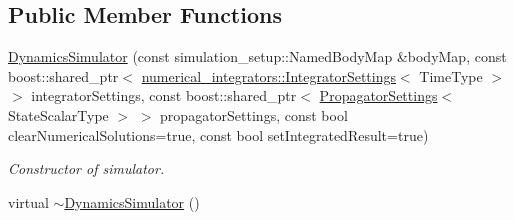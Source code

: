 \subsection*{Public Member Functions}
\begin{DoxyCompactItemize}
\item 
\hyperlink{classtudat_1_1propagators_1_1DynamicsSimulator_a95efdba717f763e8957182090d92dff7}{Dynamics\+Simulator} (const simulation\+\_\+setup\+::\+Named\+Body\+Map \&body\+Map, const boost\+::shared\+\_\+ptr$<$ \hyperlink{classtudat_1_1numerical__integrators_1_1IntegratorSettings}{numerical\+\_\+integrators\+::\+Integrator\+Settings}$<$ Time\+Type $>$ $>$ integrator\+Settings, const boost\+::shared\+\_\+ptr$<$ \hyperlink{classtudat_1_1propagators_1_1PropagatorSettings}{Propagator\+Settings}$<$ State\+Scalar\+Type $>$ $>$ propagator\+Settings, const bool clear\+Numerical\+Solutions=true, const bool set\+Integrated\+Result=true)
\begin{DoxyCompactList}\small\item\em Constructor of simulator. \end{DoxyCompactList}\item 
virtual \hyperlink{classtudat_1_1propagators_1_1DynamicsSimulator_a67f2c180f0d3e5f6d60e8963a579b4f4}{$\sim$\+Dynamics\+Simulator} ()\hypertarget{classtudat_1_1propagators_1_1DynamicsSimulator_a67f2c180f0d3e5f6d60e8963a579b4f4}{}\label{classtudat_1_1propagators_1_1DynamicsSimulator_a67f2c180f0d3e5f6d60e8963a579b4f4}


\end{DoxyCompactItemize}
